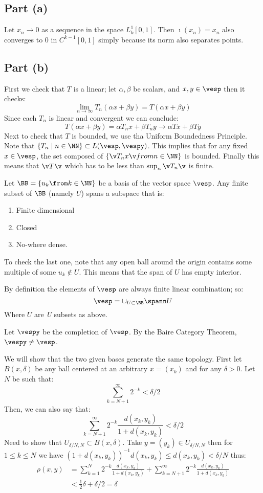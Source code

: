 \subsection*{Part (a)}
Let $x_n \to 0$ as a sequence in the space $L_k^1[0,1]$.
Then $\imath(x_n)=x_n$ also converges to $0$ in $C^{k-1}[0,1]$ simply because its norm also separates points.

\subsection*{Part (b)}
First we check that $T$ is a linear; let $\alpha,\beta$ be scalars, and $x,y\in \vesp$ then it checks:
$$\lim_{n\to \infty} T_n(\alpha x+\beta y) = T(\alpha x+\beta y)$$
Since each $T_n$ is linear and convergent we can conclude:
$$T(\alpha x+\beta y)=\alpha T_nx +\beta T_n y \to \alpha Tx + \beta Ty$$
Next to check that $T$ is bounded, we use tha Uniform Boundedness Principle.
Note that $\{T_n \mid n\in\NN \} \subset L(\vesp, \vespy)$. 
This implies that for any fixed  $x\in \vesp$, the set composed of $\{\v T_n x\v from n\in \NN\}$ is bounded.
Finally this means that $\v T\v$ which has to be less than $\sup_{n}\v T_n\v$ is finite.

Let $\BB=\{u_k\from k\in \NN\}$ be a basis of the vector space $\vesp$.
Any finite subset of $\BB$ (namely $U$) spans a subspace that is:
\begin{enumerate}
    \item Finite dimensional 
    \item Closed 
    \item No-where dense. 
\end{enumerate}
To check the last one, note that any open ball around the origin contains some multiple of some $u_k \notin U$.
This means that the span of $U$ has empty interior.

By definition the elements of $\vesp$ are always finite linear combination; so:
$$\vesp = \cup_{U\subset \BB} \spann U$$ 
Where $U$ are \emph{U} subsets as above. 

Let $\vespy$ be the completion of $\vesp$. 
By the Baire Category Theorem, $\vespy\neq \vesp$.

We will show that the two given bases generate the same topology.
First let $B(x,\delta)$ be any ball centered at an arbitrary $x=(x_k)$ and for any $\delta>0$. 
Let $N$ be such that:
$$\sum_{k=N+1}^\infty 2^{-k} < \delta/2$$
Then, we can also say that:
$$\sum_{k=N+1}^\infty 2^{-k} \frac{d(x_k,y_k)}{1+d(x_k,y_k)}< \delta/2$$
Need to show that $U_{\delta/N,N}\subset B(x,\delta)$.
Take $y=(y_k) \in U_{\delta/N,N}$ then for $1\leq k \leq N$ we have $(1+d(x_k,y_k))^{-1}d(x_k,y_k)\leq d(x_k,y_k) < \delta/N$ thus:
\begin{align*}
\rho(x,y) &= \sum_{k=1}^N 2^{-k} \frac{d(x_k,y_k)}{1+d(x_k,y_k)} + \sum_{k=N+1}^\infty 2^{-k} \frac{d(x_k,y_k)}{1+d(x_k,y_k)} \\
          &< \frac 12 \delta + \delta/2 = \delta
\end{align*}

